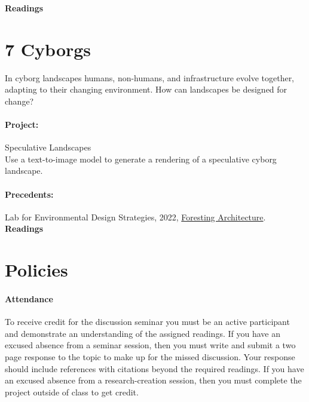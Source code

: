 \documentclass[11pt,article,oneside]{memoir}
\begin{document}
\noindent
\textbf{Readings}
\nocite{*}
\setlength{}
\printbibliography[keyword=more-than-human, heading=none]

\section{7 Cyborgs}

In cyborg landscapes 
humans, non-humans, and infrastructure evolve together, 
adapting to their changing environment. 
How can landscapes be designed for change?

\paragraph{Project:} Speculative Landscapes \\

\noindent
Use a text-to-image model to generate a rendering of a speculative cyborg landscape.

\paragraph{Precedents:} 
Lab for Environmental Design Strategies, 2022, \href{https://lab-eds.org}{Foresting Architecture}.
\\

\noindent
\textbf{Readings}
\nocite{*}
\setlength{}
\printbibliography[keyword=cyborgs, heading=none]



\section{Policies}

\paragraph{Attendance}

To receive credit for the discussion seminar 
you must be an active participant 
and demonstrate an understanding of the assigned readings.
If you have an excused absence from a seminar session,
then you must write and submit a two page response to the topic
to make up for the missed discussion.
Your response should include references with citations
beyond the required readings. 
If you have an excused absence from a research-creation session,
then you must complete the project outside of class to get credit. 
\end{document}
